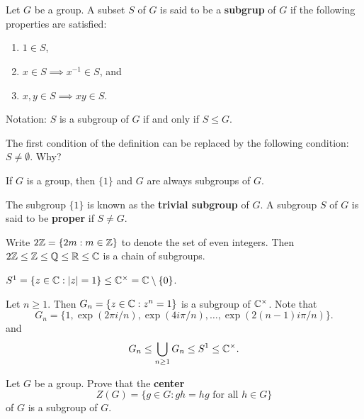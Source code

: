 \chapter{}


\begin{definition}
    Let $G$ be a group. 
        A subset $S$ of $G$ is said to be a \textbf{subgrup} of $G$ 
        if the following properties are satisfied:
        \begin{enumerate}
                \item $1\in S$,
                \item $x\in S\implies x^{-1}\in S$, and 
                \item $x,y\in S\implies xy\in S$.
        \end{enumerate}
        Notation: $S$ is a subgroup of $G$ if and only if $S\leq G$.
\end{definition}

The first condition of the definition can be replaced by
the following condition: $S\ne\emptyset$. Why? 

\begin{example}
    If $G$ is a group, then 
    $\{1\}$ and $G$ are always subgroups of $G$. 
\end{example}

The subgroup $\{1\}$ is known as the \textbf{trivial subgroup} of $G$. 
A subgroup $S$ of $G$ is said to be \textbf{proper} if $S\ne G$. 

\begin{example}
Write $2\mathbb{Z}=\{2m:m\in\mathbb{Z}\}$ to denote the set of even integers. Then 
$2\mathbb{Z}\leq\mathbb{Z}\leq\mathbb{Q}\leq\mathbb{R}\leq\mathbb{C}$ is a chain of subgroups. 
\end{example}

\begin{example}
$S^1=\{z\in\mathbb{C}:|z|=1\}\leq\mathbb{C}^\times=\mathbb{C}\setminus\{0\}$.
\end{example}

\begin{example}
Let $n\geq1$. Then $G_n=\{z\in\mathbb{C}:z^
n=1\}$ is a subgroup of $\mathbb{C}^\times$. 
Note that
\[
G_n=\{1,\exp(2\pi i/n),\exp(4i\pi/n),\dots,\exp(2(n-1)i\pi/n)\}.
\]
and 
\[
G_n\leq\bigcup_{n\geq1}G_n\leq S^1\leq\mathbb{C}^\times.
\]
\end{example}

\begin{exercise}
        Let $G$ be a group. Prove that the \textbf{center} 
        \[
                Z(G)=\{g\in G:gh=hg\text{ for all $h\in G$}\}
        \]
        of $G$ is a subgroup of $G$. 
\end{exercise}

